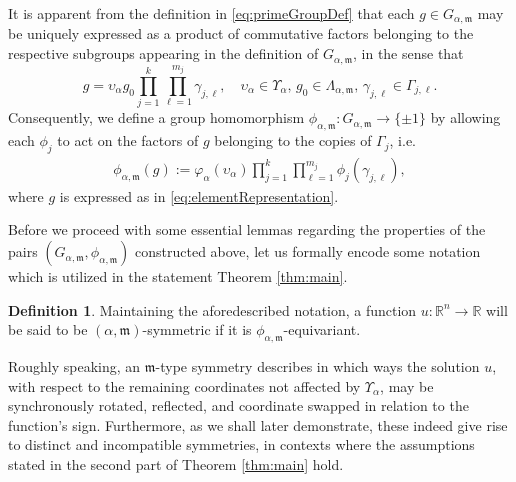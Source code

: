 \documentclass[10pt, reqno]{amsart}
\newcommand{\RR}{\mathbb{R}}
\newcommand{\m}{\mathfrak{m}}
\numberwithin{equation}{section}
\theoremstyle{definition}
\newtheorem{defn}{Definition}[section]
\theoremstyle{remark}
\theoremstyle{plain}
\begin{document}
	It is apparent from the definition in \eqref{eq:primeGroupDef} that each $g \in G_{\alpha,\m}$ may be uniquely expressed as a product of commutative factors belonging to the respective subgroups appearing in the definition of $G_{\alpha,\m}$, in the sense that
	\begin{equation}\label{eq:elementRepresentation}
		g = \upsilon_\alpha g_0 \prod_{j=1}^k \prod_{\ell=1}^{m_j} \gamma_{j,\ell}, \quad \upsilon_\alpha \in \Upsilon_\alpha,\,g_0 \in \Lambda_{\alpha,\m},\, \gamma_{j,\ell} \in \Gamma_{j,\ell}.
	\end{equation}
	Consequently, we define a group homomorphism $\phi_{\alpha,\m} : G_{\alpha,\m} \to \{\pm 1\}$ by allowing each $\phi_j$ to act on the factors of $g$ belonging to the copies of $\Gamma_j$, i.e. 
	\begin{align*}
		\phi_{\alpha,\m}(g) :=  \varphi_\alpha(\upsilon_\alpha)\prod_{j=1}^k \prod_{\ell=1}^{m_j} \phi_j(\gamma_{j,\ell}),
	\end{align*}
	where $g$ is expressed as in \eqref{eq:elementRepresentation}.
	
	Before we proceed with some essential lemmas regarding the properties of the pairs $(G_{\alpha,\m}, \phi_{\alpha,\m})$ constructed above, let us formally encode some notation which is utilized in the statement Theorem \ref{thm:main}.
	
	\begin{defn}\label{def:Sn}
		Maintaining the aforedescribed notation, a function $u : \RR^n \to \RR$ will be said to be $(\alpha,\m)$-symmetric if it is $\phi_{\alpha,\m}$-equivariant.
	\end{defn}
	
	Roughly speaking, an $\m$-type symmetry describes in which ways the solution $u$, with respect to the remaining coordinates not affected by $\Upsilon_\alpha$, may be synchronously rotated, reflected, and coordinate swapped in relation to the function's sign. Furthermore, as we shall later demonstrate, these indeed give rise to distinct and incompatible symmetries, in contexts where the assumptions stated in the second part of Theorem \ref{thm:main} hold.
	
\end{document}
